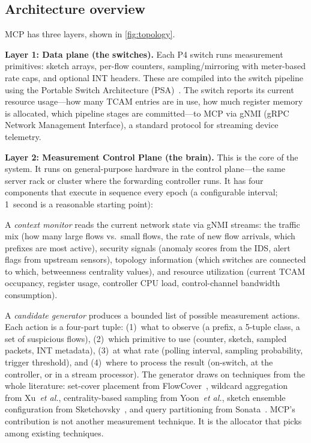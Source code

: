 \documentclass[letterpaper,twocolumn,10pt]{article}
\newcommand{\system}{MCP\xspace}
\newcommand{\etal}{\textit{et al.}\xspace}
\newcommand{\para}[1]{\smallskip\noindent\textbf{#1.}}
\begin{document}
\subsection{Architecture overview}

\system has three layers, shown in \cref{fig:topology}.

\para{Layer 1: Data plane (the switches)}
Each P4 switch runs measurement primitives: sketch arrays,
per-flow counters, sampling/mirroring with meter-based rate caps,
and optional INT headers. These are compiled into the switch
pipeline using the Portable Switch Architecture
(PSA)~\cite{p4psa}. The switch reports its current resource
usage---how many TCAM entries are in use, how much register
memory is allocated, which pipeline stages are committed---to
\system via gNMI (gRPC Network Management Interface), a standard
protocol for streaming device telemetry.

\para{Layer 2: Measurement Control Plane (the brain)}
This is the core of the system. It runs on general-purpose
hardware in the control plane---the same server rack or cluster
where the forwarding controller runs. It has four components that
execute in sequence every epoch (a configurable interval;
1~second is a reasonable starting point):

A \emph{context monitor} reads the current network state via gNMI
streams: the traffic mix (how many large flows vs.\ small flows,
the rate of new flow arrivals, which prefixes are most active),
security signals (anomaly scores from the IDS, alert flags from
upstream sensors), topology information (which switches are
connected to which, betweenness centrality values), and resource
utilization (current TCAM occupancy, register usage, controller
CPU load, control-channel bandwidth consumption).

A \emph{candidate generator} produces a bounded list of possible
measurement actions. Each action is a four-part tuple: (1)~what
to observe (a prefix, a 5-tuple class, a set of suspicious
flows), (2)~which primitive to use (counter, sketch, sampled
packets, INT metadata), (3)~at what rate (polling interval,
sampling probability, trigger threshold), and (4)~where to
process the result (on-switch, at the controller, or in a
stream processor). The generator draws on techniques from the
whole literature: set-cover placement from
FlowCover~\cite{su2014flowcover}, wildcard aggregation from
Xu~\etal\cite{xu2017wildcard}, centrality-based sampling from
Yoon~\etal\cite{yoon2017sampling}, sketch ensemble
configuration from
Sketchovsky~\cite{namkung2023sketchovsky}, and query
partitioning from Sonata~\cite{gupta2018sonata}. \system's
contribution is not another measurement technique. It is the
allocator that picks among existing techniques.
\end{document}
